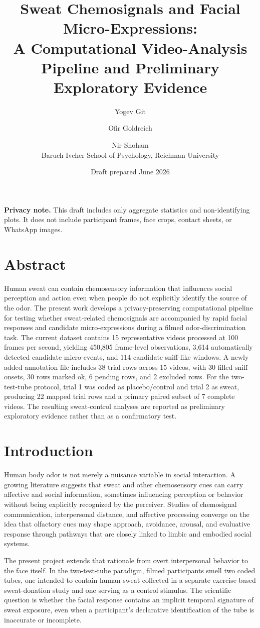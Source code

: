 \documentclass[11pt]{article}
\title{Sweat Chemosignals and Facial Micro-Expressions:\\A Computational Video-Analysis Pipeline and Preliminary Exploratory Evidence}
\author{Yogev Git \and Ofir Goldreich \and Nir Shoham \\ Baruch Ivcher School of Psychology, Reichman University}
\date{Draft prepared June 2026}
\begin{document}
\maketitle
\noindent\textbf{Privacy note.} This draft includes only aggregate statistics and non-identifying plots. It does not include participant frames, face crops, contact sheets, or WhatsApp images.

\section*{Abstract}
Human sweat can contain chemosensory information that influences social perception and action even when people do not explicitly identify the source of the odor. The present work develops a privacy-preserving computational pipeline for testing whether sweat-related chemosignals are accompanied by rapid facial responses and candidate micro-expressions during a filmed odor-discrimination task. The current dataset contains 15 representative videos processed at 100 frames per second, yielding 450,805 frame-level observations, 3,614 automatically detected candidate micro-events, and 114 candidate sniff-like windows. A newly added annotation file includes 38 trial rows across 15 videos, with 30 filled sniff onsets, 30 rows marked ok, 6 pending rows, and 2 excluded rows. For the two-test-tube protocol, trial 1 was coded as placebo/control and trial 2 as sweat, producing 22 mapped trial rows and a primary paired subset of 7 complete videos. The resulting sweat-control analyses are reported as preliminary exploratory evidence rather than as a confirmatory test.

\section{Introduction}
Human body odor is not merely a nuisance variable in social interaction. A growing literature suggests that sweat and other chemosensory cues can carry affective and social information, sometimes influencing perception or behavior without being explicitly recognized by the perceiver. Studies of chemosignal communication, interpersonal distance, and affective processing converge on the idea that olfactory cues may shape approach, avoidance, arousal, and evaluative response through pathways that are closely linked to limbic and embodied social systems.

The present project extends that rationale from overt interpersonal behavior to the face itself. In the two-test-tube paradigm, filmed participants smell two coded tubes, one intended to contain human sweat collected in a separate exercise-based sweat-donation study and one serving as a control stimulus. The scientific question is whether the facial response contains an implicit temporal signature of sweat exposure, even when a participant's declarative identification of the tube is inaccurate or incomplete.
\end{document}
